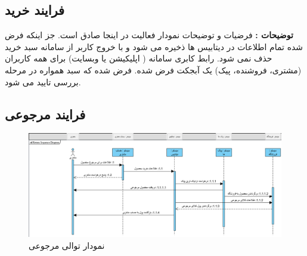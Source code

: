 \documentclass[12pt,a4paper]{article}
\begin{document}
	\subsection{فرایند خرید} \label{section.sequence.buy}
	\textbf{توضیحات :}
	فرضیات و توضیحات نمودار فعالیت در اینجا صادق است. جز اینکه فرض شده تمام اطلاعات در دیتابیس ها ذخیره می شود و با خروج کاربر از سامانه سبد خرید حذف نمی شود.
	رابط کابری سامانه (  اپلیکیشن یا وبسایت) برای همه کاربران (مشتری، فروشنده، پیک) یک آبجکت فرض شده.
	فرض شده که سبد همواره در مرحله بررسی تایید می شود.
	
	\pagebreak
	\subsection{فرایند مرجوعی} \label{section.sequence.return}
		\begin{figure}[h!]
			\begin{center}
				\includegraphics[width=14cm]{images/Return Sequence Diagram.png}
			\end{center}
			\caption{نمودار توالی مرجوعی}
		\end{figure}
		
		\pagebreak
	

\pagebreak
\end{document}
